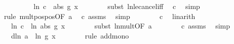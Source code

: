 \begin{isabellebody}
\ \ \ \ \isamarkupfalse%
\ \isamarkupfalse%
\ {\isachardoublequoteopen}{\isachardot}{\kern0pt}{\isachardot}{\kern0pt}{\isachardot}{\kern0pt}\ {\isasymle}\ ln\ {\isacharparenleft}{\kern0pt}c\ {\isacharasterisk}{\kern0pt}\ abs\ {\isacharparenleft}{\kern0pt}g\ x{\isacharparenright}{\kern0pt}{\isacharparenright}{\kern0pt}{\isachardoublequoteclose}\isanewline
\ \ \ \ \ \ \isamarkupfalse%
\ {\isacharparenleft}{\kern0pt}subst\ ln{\isacharunderscore}{\kern0pt}le{\isacharunderscore}{\kern0pt}cancel{\isacharunderscore}{\kern0pt}iff{\isacharparenright}{\kern0pt}\ \isamarkupfalse%
\ c\ \isamarkupfalse%
\ simp\isanewline
\ \ \ \ \ \ \ \isamarkupfalse%
\ {\isacharparenleft}{\kern0pt}rule\ mult{\isacharunderscore}{\kern0pt}pos{\isacharunderscore}{\kern0pt}pos{\isacharbrackleft}{\kern0pt}OF\ a{\isacharbrackright}{\kern0pt}{\isacharparenright}{\kern0pt}\ \isamarkupfalse%
\ c\ assms{\isacharparenleft}{\kern0pt}{}{\isacharparenright}{\kern0pt}\ \isamarkupfalse%
\ simp\isanewline
\ \ \ \ \ \ \isamarkupfalse%
\ c\ \isamarkupfalse%
\ linarith\isanewline
\ \ \ \ \isamarkupfalse%
\ \isamarkupfalse%
\ {\isachardoublequoteopen}{\isachardot}{\kern0pt}{\isachardot}{\kern0pt}{\isachardot}{\kern0pt}\ {\isasymle}\ ln\ c\ {\isacharplus}{\kern0pt}\ ln\ {\isacharparenleft}{\kern0pt}abs\ {\isacharparenleft}{\kern0pt}g\ x{\isacharparenright}{\kern0pt}{\isacharparenright}{\kern0pt}{\isachardoublequoteclose}\isanewline
\ \ \ \ \ \ \isamarkupfalse%
\ {\isacharparenleft}{\kern0pt}subst\ ln{\isacharunderscore}{\kern0pt}mult{\isacharbrackleft}{\kern0pt}OF\ a{\isacharbrackright}{\kern0pt}{\isacharparenright}{\kern0pt}\isanewline
\ \ \ \ \ \ \isamarkupfalse%
\ c\ assms{\isacharparenleft}{\kern0pt}{}{\isacharparenright}{\kern0pt}\ \isamarkupfalse%
\ simp{\isacharplus}{\kern0pt}\isanewline
\ \ \ \ \isamarkupfalse%
\ \isamarkupfalse%
\ {\isachardoublequoteopen}{\isachardot}{\kern0pt}{\isachardot}{\kern0pt}{\isachardot}{\kern0pt}\ {\isasymle}\ {\isacharparenleft}{\kern0pt}d{\isacharminus}{\kern0pt}{}{\isacharparenright}{\kern0pt}{\isacharasterisk}{\kern0pt}ln\ a\ {\isacharplus}{\kern0pt}\ ln\ {\isacharparenleft}{\kern0pt}g\ x{\isacharparenright}{\kern0pt}{\isachardoublequoteclose}\isanewline
\ \ \ \ \ \ \isamarkupfalse%
\ {\isacharparenleft}{\kern0pt}rule\ add{\isacharunderscore}{\kern0pt}mono{\isacharparenright}{\kern0pt}\isanewline

\end{isabellebody}
